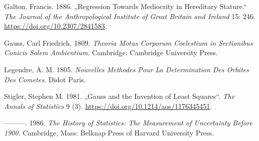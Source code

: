 \documentclass[
  letterpaper,
  DIV=11]{scrartcl}
\newlength{\cslhangindent}
\newlength{\cslentryspacingunit} %
\newenvironment{CSLReferences}[2] %
 {%
  \setlength{\parindent}{0pt}
  \ifodd #1
  \let\oldpar\par
  \def\par{\hangindent=\cslhangindent\oldpar}
  \fi
  \setlength{\parskip}{#2\cslentryspacingunit}
 }%
 {}
\theoremstyle{plain}
\theoremstyle{definition}
\theoremstyle{remark}
\begin{document}
\hypertarget{refs}{}
\begin{CSLReferences}{1}{0}
\leavevmode{}%
Galton, Francis. 1886. {„Regression {Towards Mediocrity} in {Hereditary
Stature}.``} \emph{The Journal of the Anthropological Institute of Great
Britain and Ireland} 15: 246. \url{https://doi.org/10.2307/2841583}.

\leavevmode{}%
Gauss, Carl Friedrich. 1809. \emph{Theoria {Motus Corporum Coelestium}
in {Sectionibus Conicis Solem Ambientium}}. {Cambridge}: {Cambridge
University Press}.

\leavevmode{}%
Legendre, A. M. 1805. \emph{Nouvelles Methodes Pour La Determination Des
Orbites Des Cometes}. {Didot Paris}.

\leavevmode{}%
Stigler, Stephen M. 1981. {„Gauss and the {Invention} of {Least
Squares}``}. \emph{The Annals of Statistics} 9 (3).
\url{https://doi.org/10.1214/aos/1176345451}.

\leavevmode{}%
---------. 1986. \emph{The History of Statistics: The Measurement of
Uncertainty Before 1900}. {Cambridge, Mass}: {Belknap Press of Harvard
University Press}.

\end{CSLReferences}
\end{document}
